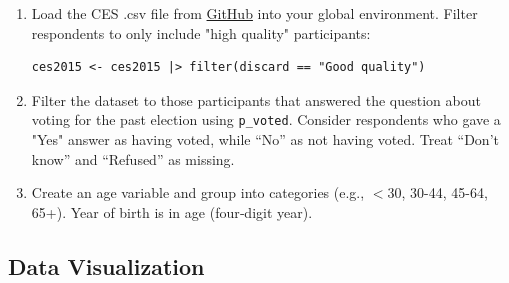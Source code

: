 \documentclass[12pt,letterpaper]{article}
\begin{document}
\begin{enumerate}
\item Load the CES .csv file from \href{https://raw.githubusercontent.com/ASDS-TCD/DataViz_2026/refs/heads/main/datasets/CES2015.csv}{GitHub} into your global environment. Filter respondents to only include "high quality" participants: 
\begin{verbatim}
ces2015 <- ces2015 |> filter(discard == "Good quality")
\end{verbatim}

\item Filter the dataset to those participants that answered the question about voting for the past election using \texttt{p\_voted}. Consider respondents who gave a "Yes" answer as having voted, while “No” as not having voted. Treat “Don’t know” and “Refused” as missing.


\item Create an age variable and group into categories (e.g., $<$30, 30-44, 45-64, 65+). Year of birth is in age (four‑digit year).

\end{enumerate}

\subsection*{Data Visualization}
\end{document}
